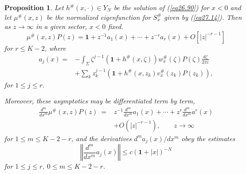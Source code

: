 \documentclass{surv-l}
\theoremstyle{plain}
\newtheorem{prop}[theorem]{Proposition}
\theoremstyle{definition}
\numberwithin{equation}{chapter}
\begin{document}
\renewcommand\thetheorem{29.\arabic{theorem}}
\begin{prop}\label{eq29.1}
Let $h^{\#}(x, \cdot)\in Y_{N}$ be the solution of \emph{(\ref{eq26.90})} for $x<0$
and let $\mu^{\#}(x,z)$ be the normalized eigenfunction for
$S_{x}^{\#}$ given by \emph{(\ref{eq27.14})}. Then as $ z\rightarrow\infty$ in a given sector, $x<0$ fixed.
\setcounter{equation}{1}
\begin{equation}\label{eq29.2}
\mu^{\#}(x, z)P(z)=\mathbf{1}+z^{-1}a_{1}(x)+\cdots+z^{-r}a_{r}(x)+O[|z|^{-r-1}]
\end{equation}
for $r\leq K-2$, where
\begin{align}\label{eq29.3}
a_{j}(x)=&-\int_{\Sigma}\zeta^{j-1}(\mathbf{1}+h^{\#}(x, \zeta))w_{x}^{\#}(\zeta)P(\zeta)\frac{d{\zeta}}{2\pi i}\\
&+\sum_{k}z_{k}^{j-1}(\mathbf{1}+h^{\#}(x, z_{k})v_{x}^{\#}(z_{k})P(z_{k})),\nonumber
\end{align}
for $1\leq j\leq r$.

Moreover, these asymptotics may be differentiated term by term,
\begin{align}\label{eq29.4}
\frac{d^{m}}{dx^{m}}\mu^{\#}(x,z)P(z)\ =&z^{-1}\frac{d^{m}}{dx^{m}}a_{1}(x)+\cdots +z^{r}\frac{d^{m}}{dx^{m}}a^{r}(x)\\\nonumber
&+O(|z|^{-r-1}),\qquad z\rightarrow\infty
\end{align}
for $1\leq m\leq K-2-r$, and the derivatives $d^{m}a_{j}(x)/dx^{m}$ obey the estimates
\begin{equation}\label{eq29.5}
\left\Vert\frac{d^{m}}{dx^{m}}a_{j}(x)\right\Vert\leq c(\mathbf{1}+|x|)^{-N}
\end{equation}
for $1\leq j\leq r,\ 0\leq m\leq K-2-r$.
\end{prop}
\end{document}
